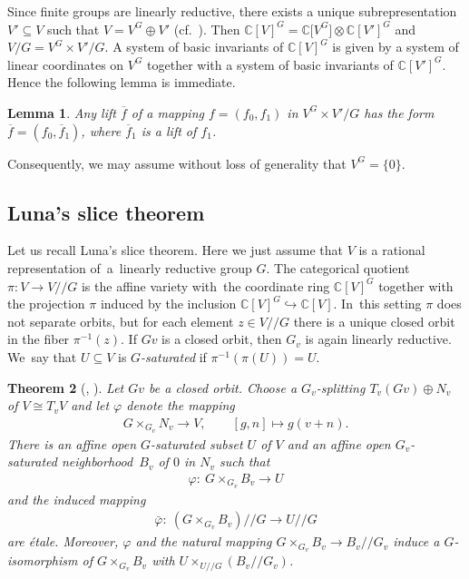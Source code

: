\documentclass[11pt]{article}
\numberwithin{equation}{section}
\numberwithin{equation}{section}
\newtheorem{Theorem}{Theorem}[section]
\newtheorem{Lemma}[Theorem]{Lemma}
\def\vh{\varphi}
\def\C{\mathbb{C}}
\def\cq{{/\!\!/}}
\begin{document}
Since finite groups are linearly reductive,
there exists a unique subrepresentation $V' \subseteq V$ such that $V = V^G \oplus V'$ (cf.\ \cite[Theorem 2.2.5]{DK02}).
Then
$\C[V]^G = \C\big[V^G\big] \otimes \C[V']^G$ and
$V/ G = V^G \times V' / G$.
A system of basic invariants of $\C[V]^G$ is given by a system of linear coordinates on $V^G$ together with a
system of basic invariants of $\C[V']^G$. Hence the following lemma is immediate.

\begin{Lemma} \label{fix}
Any lift $\overline f$ of a mapping $f=(f_0,f_1)$ in $V^G \times V' / G$ has the form
$\overline f = (f_0,\overline f_1)$,
where $\overline f_1$ is a lift of $f_1$.
\end{Lemma}


Consequently, we may assume without loss of generality that $V^G = \{0\}$.


\subsection{Luna's slice theorem}
Let us recall Luna's slice theorem.
Here we just assume that $V$ is a rational representation of~a~linearly reductive group $G$.
The categorical quotient $\pi \colon V \to V\cq G$ is the affine variety with~the coordinate ring $\C[V]^G$
together with the projection $\pi$ induced by the inclusion \mbox{$\C[V]^G \hookrightarrow \C[V]$}. In~this setting $\pi$ does not separate orbits, but for each element $z \in V \cq G$ there is a unique
closed orbit in the fiber $\pi^{-1}(z)$.
If $Gv$ is a closed orbit, then $G_v$ is again linearly reductive. We~say that $U \subseteq V$ is \emph{$G$-saturated} if $\pi^{-1} (\pi(U)) = U$.

\begin{Theorem}[{\cite{Luna73}, \cite[Theorem 5.3]{Schwarz80}}] \label{Luna}
Let $Gv$ be a closed orbit.
Choose a $G_v$-splitting \mbox{$T_v (Gv) \oplus N_v$} of $V \cong T_v V$ and let $\vh$ denote the mapping
\begin{gather*}
 G \times_{G_v} N_v \to V, \qquad [g,n] \mapsto g(v+n).
\end{gather*}
There is an affine open $G$-saturated subset $U$ of $V$ and an affine open $G_v$-saturated neighborhood~$B_v$ of $0$ in $N_v$
such that
\begin{gather*}
 \vh \colon\ G \times_{G_v} B_v \to U
\end{gather*}
and the induced mapping
\begin{gather*}
 \bar \vh \colon\ (G \times_{G_v} B_v)\cq G \to U\cq G
\end{gather*}
are \'etale.
Moreover, $\vh$ and the natural mapping $G \times_{G_v} B_v \to B_v \cq G_v$
induce a $G$-isomorphism of $G \times_{G_v} B_v$ with $U \times_{U\cq G} (B_v\cq G_v)$.
\end{Theorem}
\end{document}
